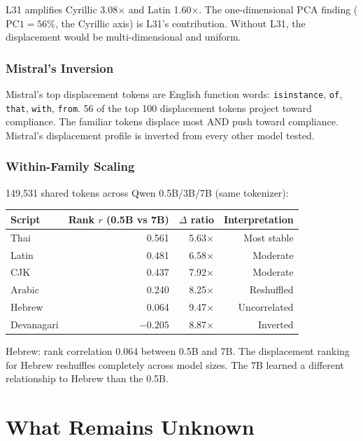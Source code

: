 \documentclass[11pt,a4paper]{article}
\begin{document}
L31 amplifies Cyrillic 3.08$\times$ and Latin 1.60$\times$. The one-dimensional PCA finding ($\text{PC1} = 56\%$, the Cyrillic axis) is L31's contribution. Without L31, the displacement would be multi-dimensional and uniform.

\section{Mistral's Inversion}

Mistral's top displacement tokens are English function words: \texttt{isinstance}, \texttt{of}, \texttt{that}, \texttt{with}, \texttt{from}. 56 of the top 100 displacement tokens project toward compliance. The familiar tokens displace most AND push toward compliance. Mistral's displacement profile is inverted from every other model tested.

\section{Within-Family Scaling}

149,531 shared tokens across Qwen 0.5B/3B/7B (same tokenizer):

\begin{center}
\begin{tabular}{lrrr}
\toprule
\textbf{Script} & \textbf{Rank $r$ (0.5B vs 7B)} & \textbf{$\Delta$ ratio} & \textbf{Interpretation} \\
\midrule
Thai & 0.561 & 5.63$\times$ & Most stable \\
Latin & 0.481 & 6.58$\times$ & Moderate \\
CJK & 0.437 & 7.92$\times$ & Moderate \\
Arabic & 0.240 & 8.25$\times$ & Reshuffled \\
Hebrew & 0.064 & 9.47$\times$ & Uncorrelated \\
Devanagari & $-0.205$ & 8.87$\times$ & Inverted \\
\bottomrule
\end{tabular}
\end{center}

Hebrew: rank correlation 0.064 between 0.5B and 7B. The displacement ranking for Hebrew reshuffles completely across model sizes. The 7B learned a different relationship to Hebrew than the 0.5B.

\part{What Remains Unknown}
\end{document}
